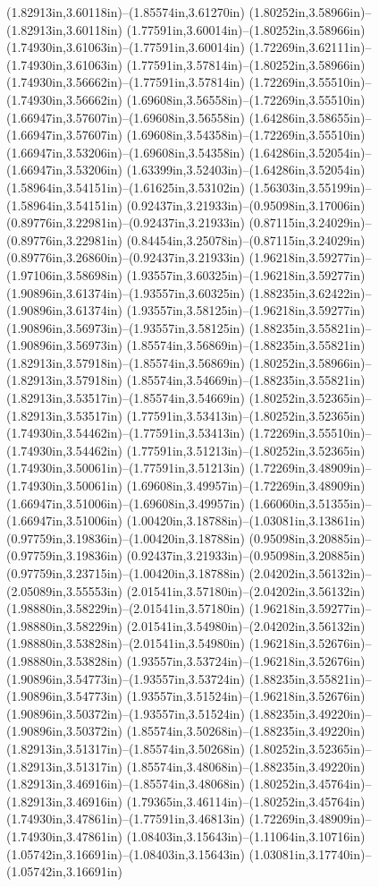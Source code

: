 (1.82913in,3.60118in)--(1.85574in,3.61270in) (1.80252in,3.58966in)--(1.82913in,3.60118in) (1.77591in,3.60014in)--(1.80252in,3.58966in) (1.74930in,3.61063in)--(1.77591in,3.60014in) (1.72269in,3.62111in)--(1.74930in,3.61063in) (1.77591in,3.57814in)--(1.80252in,3.58966in) (1.74930in,3.56662in)--(1.77591in,3.57814in) (1.72269in,3.55510in)--(1.74930in,3.56662in) (1.69608in,3.56558in)--(1.72269in,3.55510in) (1.66947in,3.57607in)--(1.69608in,3.56558in) (1.64286in,3.58655in)--(1.66947in,3.57607in) (1.69608in,3.54358in)--(1.72269in,3.55510in) (1.66947in,3.53206in)--(1.69608in,3.54358in) (1.64286in,3.52054in)--(1.66947in,3.53206in) (1.63399in,3.52403in)--(1.64286in,3.52054in) (1.58964in,3.54151in)--(1.61625in,3.53102in) (1.56303in,3.55199in)--(1.58964in,3.54151in) (0.92437in,3.21933in)--(0.95098in,3.17006in) (0.89776in,3.22981in)--(0.92437in,3.21933in) (0.87115in,3.24029in)--(0.89776in,3.22981in) (0.84454in,3.25078in)--(0.87115in,3.24029in) (0.89776in,3.26860in)--(0.92437in,3.21933in) (1.96218in,3.59277in)--(1.97106in,3.58698in) (1.93557in,3.60325in)--(1.96218in,3.59277in) (1.90896in,3.61374in)--(1.93557in,3.60325in) (1.88235in,3.62422in)--(1.90896in,3.61374in) (1.93557in,3.58125in)--(1.96218in,3.59277in) (1.90896in,3.56973in)--(1.93557in,3.58125in) (1.88235in,3.55821in)--(1.90896in,3.56973in) (1.85574in,3.56869in)--(1.88235in,3.55821in) (1.82913in,3.57918in)--(1.85574in,3.56869in) (1.80252in,3.58966in)--(1.82913in,3.57918in) (1.85574in,3.54669in)--(1.88235in,3.55821in) (1.82913in,3.53517in)--(1.85574in,3.54669in) (1.80252in,3.52365in)--(1.82913in,3.53517in) (1.77591in,3.53413in)--(1.80252in,3.52365in) (1.74930in,3.54462in)--(1.77591in,3.53413in) (1.72269in,3.55510in)--(1.74930in,3.54462in) (1.77591in,3.51213in)--(1.80252in,3.52365in) (1.74930in,3.50061in)--(1.77591in,3.51213in) (1.72269in,3.48909in)--(1.74930in,3.50061in) (1.69608in,3.49957in)--(1.72269in,3.48909in) (1.66947in,3.51006in)--(1.69608in,3.49957in) (1.66060in,3.51355in)--(1.66947in,3.51006in) (1.00420in,3.18788in)--(1.03081in,3.13861in) (0.97759in,3.19836in)--(1.00420in,3.18788in) (0.95098in,3.20885in)--(0.97759in,3.19836in) (0.92437in,3.21933in)--(0.95098in,3.20885in) (0.97759in,3.23715in)--(1.00420in,3.18788in) (2.04202in,3.56132in)--(2.05089in,3.55553in) (2.01541in,3.57180in)--(2.04202in,3.56132in) (1.98880in,3.58229in)--(2.01541in,3.57180in) (1.96218in,3.59277in)--(1.98880in,3.58229in) (2.01541in,3.54980in)--(2.04202in,3.56132in) (1.98880in,3.53828in)--(2.01541in,3.54980in) (1.96218in,3.52676in)--(1.98880in,3.53828in) (1.93557in,3.53724in)--(1.96218in,3.52676in) (1.90896in,3.54773in)--(1.93557in,3.53724in) (1.88235in,3.55821in)--(1.90896in,3.54773in) (1.93557in,3.51524in)--(1.96218in,3.52676in) (1.90896in,3.50372in)--(1.93557in,3.51524in) (1.88235in,3.49220in)--(1.90896in,3.50372in) (1.85574in,3.50268in)--(1.88235in,3.49220in) (1.82913in,3.51317in)--(1.85574in,3.50268in) (1.80252in,3.52365in)--(1.82913in,3.51317in) (1.85574in,3.48068in)--(1.88235in,3.49220in) (1.82913in,3.46916in)--(1.85574in,3.48068in) (1.80252in,3.45764in)--(1.82913in,3.46916in) (1.79365in,3.46114in)--(1.80252in,3.45764in) (1.74930in,3.47861in)--(1.77591in,3.46813in) (1.72269in,3.48909in)--(1.74930in,3.47861in) (1.08403in,3.15643in)--(1.11064in,3.10716in) (1.05742in,3.16691in)--(1.08403in,3.15643in) (1.03081in,3.17740in)--(1.05742in,3.16691in) 